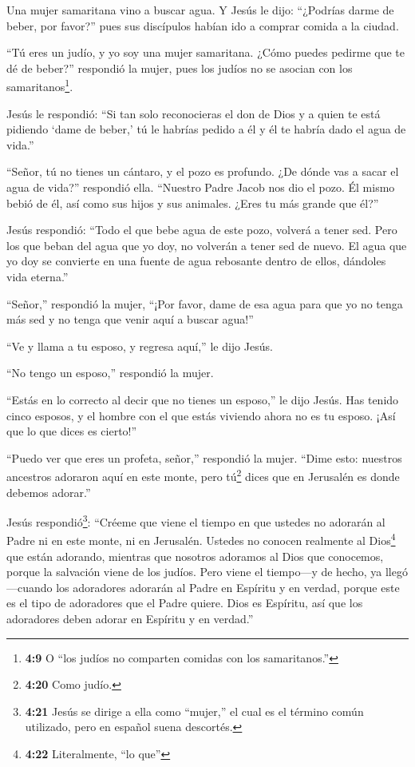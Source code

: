 Una mujer samaritana vino a buscar agua. Y Jesús le dijo:
``¿Podrías darme de beber, por favor?''  pues sus discípulos
habían ido a comprar comida a la ciudad.

 ``Tú eres un judío, y yo soy una mujer samaritana. ¿Cómo
puedes pedirme que te dé de beber?'' respondió la mujer, pues los judíos
no se asocian con los samaritanos\footnote{\textbf{4:9} O ``los judíos
  no comparten comidas con los samaritanos.''}.

 Jesús le respondió: ``Si tan solo reconocieras el don de
Dios y a quien te está pidiendo `dame de beber,' tú le habrías pedido a
él y él te habría dado el agua de vida.''

 ``Señor, tú no tienes un cántaro, y el pozo es profundo.
¿De dónde vas a sacar el agua de vida?'' respondió ella. 
``Nuestro Padre Jacob nos dio el pozo. Él mismo bebió de él, así como
sus hijos y sus animales. ¿Eres tu más grande que él?''

 Jesús respondió: ``Todo el que bebe agua de este pozo,
volverá a tener sed.  Pero los que beban del agua que yo
doy, no volverán a tener sed de nuevo. El agua que yo doy se convierte
en una fuente de agua rebosante dentro de ellos, dándoles vida eterna.''

 ``Señor,'' respondió la mujer, ``¡Por favor, dame de esa
agua para que yo no tenga más sed y no tenga que venir aquí a buscar
agua!''

 ``Ve y llama a tu esposo, y regresa aquí,'' le dijo Jesús.

 ``No tengo un esposo,'' respondió la mujer.

``Estás en lo correcto al decir que no tienes un esposo,'' le dijo
Jesús.  Has tenido cinco esposos, y el hombre con el que
estás viviendo ahora no es tu esposo. ¡Así que lo que dices es cierto!''

 ``Puedo ver que eres un profeta, señor,'' respondió la
mujer.  ``Dime esto: nuestros ancestros adoraron aquí en
este monte, pero tú\footnote{\textbf{4:20} Como judío.} dices que en
Jerusalén es donde debemos adorar.''

 Jesús respondió\footnote{\textbf{4:21} Jesús se dirige a
  ella como ``mujer,'' el cual es el término común utilizado, pero en
  español suena descortés.}: ``Créeme que viene el tiempo en que ustedes
no adorarán al Padre ni en este monte, ni en Jerusalén. 
Ustedes no conocen realmente al Dios\footnote{\textbf{4:22}
  Literalmente, ``lo que''} que están adorando, mientras que nosotros
adoramos al Dios que conocemos, porque la salvación viene de los judíos.
 Pero viene el tiempo---y de hecho, ya llegó---cuando los
adoradores adorarán al Padre en Espíritu y en verdad, porque este es el
tipo de adoradores que el Padre quiere.  Dios es Espíritu,
así que los adoradores deben adorar en Espíritu y en verdad.''


